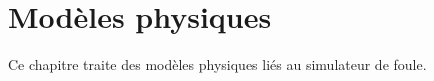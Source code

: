 \chapter{Modèles physiques}
%
Ce chapitre traite des modèles physiques liés au simulateur de foule.
%



%
